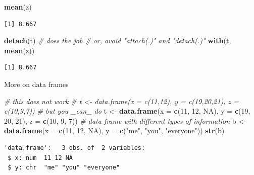 \documentclass[
]{book}
\newenvironment{Shaded}{\begin{snugshade}}{\end{snugshade}}
\newcommand{\CommentTok}[1]{\textcolor[rgb]{0.56,0.35,0.01}{\textit{#1}}}
\newcommand{\DataTypeTok}[1]{\textcolor[rgb]{0.13,0.29,0.53}{#1}}
\newcommand{\DecValTok}[1]{\textcolor[rgb]{0.00,0.00,0.81}{#1}}
\newcommand{\KeywordTok}[1]{\textcolor[rgb]{0.13,0.29,0.53}{\textbf{#1}}}
\newcommand{\NormalTok}[1]{#1}
\newcommand{\OtherTok}[1]{\textcolor[rgb]{0.56,0.35,0.01}{#1}}
\newcommand{\StringTok}[1]{\textcolor[rgb]{0.31,0.60,0.02}{#1}}
\begin{document}
\begin{Shaded}
\begin{Highlighting}[]
\KeywordTok{mean}\NormalTok{(z)}
\end{Highlighting}
\end{Shaded}

\begin{verbatim}
[1] 8.667
\end{verbatim}

\begin{Shaded}
\begin{Highlighting}[]
\KeywordTok{detach}\NormalTok{(t) }\CommentTok{# does the job}
\CommentTok{# or, avoid "attach(.)" and "detach(.)"}
\KeywordTok{with}\NormalTok{(t, }\KeywordTok{mean}\NormalTok{(z))}
\end{Highlighting}
\end{Shaded}

\begin{verbatim}
[1] 8.667
\end{verbatim}

More on data frames

\begin{Shaded}
\begin{Highlighting}[]
\CommentTok{# this does not work}
\CommentTok{# t <- data.frame(x = c(11,12), y = c(19,20,21), z = c(10,9,7)) }
\CommentTok{# but you _can_ do}
\NormalTok{t <-}\StringTok{ }\KeywordTok{data.frame}\NormalTok{(}\DataTypeTok{x =} \KeywordTok{c}\NormalTok{(}\DecValTok{11}\NormalTok{, }\DecValTok{12}\NormalTok{, }\OtherTok{NA}\NormalTok{), }\DataTypeTok{y =} \KeywordTok{c}\NormalTok{(}\DecValTok{19}\NormalTok{, }\DecValTok{20}\NormalTok{, }\DecValTok{21}\NormalTok{), }\DataTypeTok{z =} \KeywordTok{c}\NormalTok{(}\DecValTok{10}\NormalTok{, }\DecValTok{9}\NormalTok{, }\DecValTok{7}\NormalTok{))}
\CommentTok{# data frame with different types of information}
\NormalTok{b <-}\StringTok{ }\KeywordTok{data.frame}\NormalTok{(}\DataTypeTok{x =} \KeywordTok{c}\NormalTok{(}\DecValTok{11}\NormalTok{, }\DecValTok{12}\NormalTok{, }\OtherTok{NA}\NormalTok{), }\DataTypeTok{y =} \KeywordTok{c}\NormalTok{(}\StringTok{"me"}\NormalTok{, }\StringTok{"you"}\NormalTok{, }\StringTok{"everyone"}\NormalTok{))}
\KeywordTok{str}\NormalTok{(b)}
\end{Highlighting}
\end{Shaded}

\begin{verbatim}
'data.frame':	3 obs. of  2 variables:
 $ x: num  11 12 NA
 $ y: chr  "me" "you" "everyone"
\end{verbatim}
\end{document}
